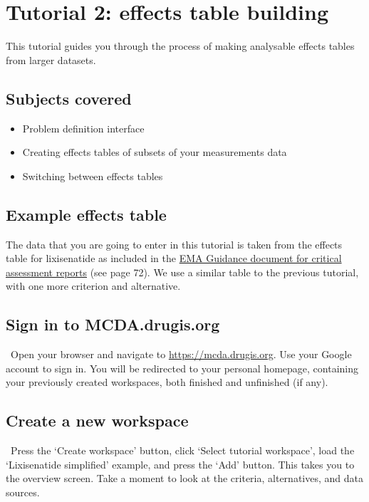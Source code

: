 \documentclass[00_mcda_tutorial.tex]{subfiles}
\begin{document}
\section*{Tutorial 2: effects table building}
\addtocounter{section}{1}

This tutorial guides you through the process of making analysable effects tables from larger datasets.

\subsection*{Subjects covered}
\begin{itemize}
\item Problem definition interface
\item Creating effects tables of subsets of your measurements data
\item Switching between effects tables
\end{itemize}

\subsection*{Example effects table}
The data that you are going to enter in this tutorial is taken from the effects table for lixisenatide as included in the \href{https://www.ema.europa.eu/documents/template-form/day-80-assessment-report-overview-d120-loq-template-guidance-rev-0718_en.doc}{EMA Guidance document for critical assessment reports} (see page 72). We use a similar table to the previous tutorial, with one more criterion and alternative.

\subsection*{Sign in to MCDA.drugis.org}
\leftpointright \, Open your browser and navigate to \href{https://mcda.drugis.org}{https://mcda.drugis.org}. Use your Google account to sign in. You will be redirected to your personal homepage, containing your previously created workspaces, both finished and unfinished (if any).

\subsection*{Create a new workspace}
\leftpointright \, Press the ‘Create workspace’ button, click ‘Select tutorial workspace’, load the ‘Lixisenatide simplified’ example, and press the ‘Add’ button. This takes you to the overview screen. Take a moment to look at the criteria, alternatives, and data sources.
\end{document}
